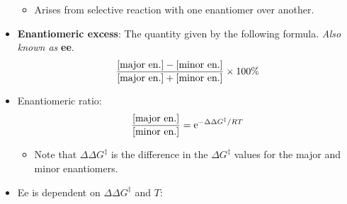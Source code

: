 \documentclass[../notes.tex]{subfiles}
\begin{document}
\begin{itemize}
    \begin{itemize}
        \item Arises from selective reaction with one enantiomer over another.
    \end{itemize}
    \item \textbf{Enantiomeric excess}: The quantity given by the following formula. \emph{Also known as} \textbf{ee}.
    \begin{equation*}
        \frac{\ce{[{major en.}]}-\ce{[{minor en.}]}}{\ce{[{major en.}]}+\ce{[{minor en.}]}}\times 100\%
    \end{equation*}
    \item Enantiomeric ratio:
    \begin{equation*}
        \frac{\ce{[{major en.}]}}{\ce{[{minor en.}]}} = \e[-\Delta\Delta G^\ddagger/RT]
    \end{equation*}
    \begin{itemize}
        \item Note that $\Delta\Delta G^\ddagger$ is the difference in the $\Delta G^\ddagger$ values for the major and minor enantiomers.
    \end{itemize}
    \item Ee is dependent on $\Delta\Delta G^\ddagger$ and $T$:
    \begin{figure}[h!]
        \centering
        \begin{subfigure}[b]{0.49\linewidth}
            \centering
\end{subfigure}
\end{figure}
\end{itemize}
\end{document}
